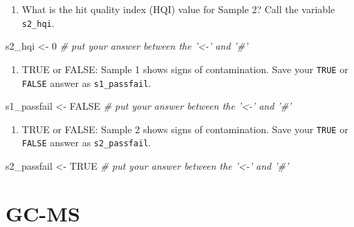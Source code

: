 \documentclass[]{tufte-book}
\newenvironment{Shaded}{}{}
\newcommand{\CommentTok}[1]{\textcolor[rgb]{0.38,0.63,0.69}{\textit{#1}}}
\newcommand{\DecValTok}[1]{\textcolor[rgb]{0.25,0.63,0.44}{#1}}
\newcommand{\NormalTok}[1]{#1}
\newcommand{\OtherTok}[1]{\textcolor[rgb]{0.00,0.44,0.13}{#1}}
\newcommand{\StringTok}[1]{\textcolor[rgb]{0.25,0.44,0.63}{#1}}
\providecommand{\tightlist}{%
  \setlength{\itemsep}{0pt}\setlength{\parskip}{0pt}}
\begin{document}
\begin{enumerate}
\def\labelenumi{\arabic{enumi}.}
\setcounter{enumi}{3}
\tightlist
\item
  What is the hit quality index (HQI) value for Sample 2? Call the variable \texttt{s2\_hqi}.
\end{enumerate}

\begin{Shaded}
\begin{Highlighting}[]
\NormalTok{s2_hqi <-}\StringTok{ }\DecValTok{0}     \CommentTok{# put your answer between the '<-' and '#'}
\end{Highlighting}
\end{Shaded}

\begin{enumerate}
\def\labelenumi{\arabic{enumi}.}
\setcounter{enumi}{4}
\tightlist
\item
  TRUE or FALSE: Sample 1 shows signs of contamination. Save your \texttt{TRUE} or \texttt{FALSE} answer as \texttt{s1\_passfail}.
\end{enumerate}

\begin{Shaded}
\begin{Highlighting}[]
\NormalTok{s1_passfail <-}\StringTok{ }\OtherTok{FALSE}     \CommentTok{# put your answer between the '<-' and '#'}
\end{Highlighting}
\end{Shaded}

\begin{enumerate}
\def\labelenumi{\arabic{enumi}.}
\setcounter{enumi}{5}
\tightlist
\item
  TRUE or FALSE: Sample 2 shows signs of contamination. Save your \texttt{TRUE} or \texttt{FALSE} answer as \texttt{s2\_passfail}.
\end{enumerate}

\begin{Shaded}
\begin{Highlighting}[]
\NormalTok{s2_passfail <-}\StringTok{ }\OtherTok{TRUE}     \CommentTok{# put your answer between the '<-' and '#'}
\end{Highlighting}
\end{Shaded}

\newpage

\hypertarget{am-gcms}{%
\section{GC-MS}\label{am-gcms}}
\end{document}
